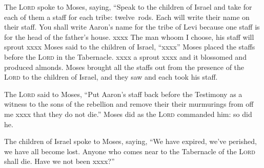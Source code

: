\begin{inparaenum}
     The \textsc{Lord} spoke to Moses, saying,%
     ``Speak to the children of Israel and take for each of them a staff for each tribe: twelve~rods. Each will write their name on their staff.%
     You shall write Aaron's name for the tribe of Levi because one staff is for the head of the father's house.%
     xxxx%
     The man whoom I choose, his staff will sprout xxxx%
     Moses said to the children of Israel, ``xxxx''%
     Moses placed the staffs before the \textsc{Lord} in the Tabernacle.%
     xxxx a sprout xxxx and it blossomed and produced almonds.%
     Moses brought all the staffs out from the presence of the \textsc{Lord} to the children of Israel, and they saw and each took his staff.%
    
     The \textsc{Lord} said to Moses, ``Put Aaron's staff back before the Testimony as a witness to the sons of the rebellion and remove their their murmurings from off me xxxx that they do not die.''%
     Moses did as the \textsc{Lord} commanded him: so did he.%
    
     The children of Israel spoke to Moses, saying, ``We have expired, we've perished, we have all become lost.%
     Anyone who comes near to the Tabernacle of the \textsc{Lord} shall die. Have we not been xxxx?''%
\end{inparaenum}

